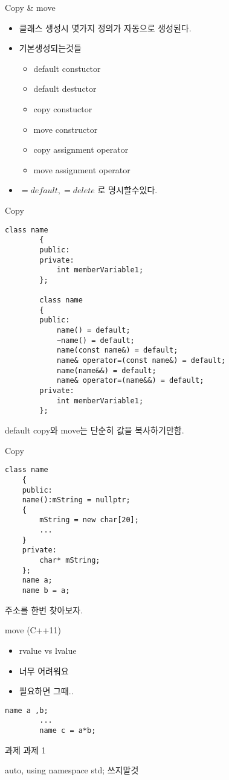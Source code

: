 \documentclass[10pt]{beamer}
\begin{document}
\begin{frame}{Copy \& move}
    \begin{itemize}
        \item 클래스 생성시 몇가지 정의가 자동으로 생성된다.
        \item 기본생성되는것들
        \begin{itemize}
            \item default constuctor
            \item default destuctor
            \item copy constuctor 
            \item move constructor
            \item copy assignment operator
            \item move assignment operator
        \end{itemize}
        \item $=default, =delete$ 로 명시할수있다.
    \end{itemize}
\end{frame}    


\begin{frame}[fragile]{Copy}
    \begin{lstlisting}[style = CStyle]
        class name
        {
        public:
        private:
            int memberVariable1;
        };

        class name
        {
        public:
            name() = default;
            ~name() = default;
            name(const name&) = default;
            name& operator=(const name&) = default;
            name(name&&) = default;
            name& operator=(name&&) = default;
        private:
            int memberVariable1;
        };
        \end{lstlisting}
        default copy와 move는 단순히 값을 복사하기만함.
\end{frame}



\begin{frame}[fragile]{Copy}
    \begin{lstlisting}[style = CStyle]
    class name
    {
    public:
    name():mString = nullptr;
    {
        mString = new char[20];
        ...
    }
    private:
        char* mString;
    };
    name a;
    name b = a;
    \end{lstlisting}
    주소를 한번 찾아보자.
\end{frame}



\begin{frame}[fragile] {move (C++11)}
    \begin{itemize}
        \item rvalue vs lvalue
        \item 너무 어려워요
        \item 필요하면 그때..
    \end{itemize}
    \begin{lstlisting}[style = CStyle]
        name a ,b;
        ...
        name c = a*b;
    \end{lstlisting}
\end{frame}

\begin{frame}{과제}
    과제 1
    
    auto, using namespace std; 쓰지말것
\end{frame}    
\end{document}
